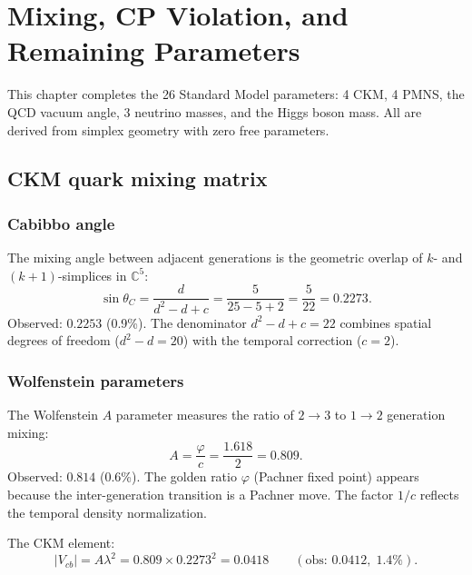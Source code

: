 \section{Mixing, CP Violation, and Remaining Parameters}
\label{ch:mixing}

This chapter completes the 26 Standard Model parameters: 4 CKM, 4 PMNS, the QCD vacuum angle, 3 neutrino masses, and the Higgs boson mass. All are derived from simplex geometry with zero free parameters.

\subsection{CKM quark mixing matrix}

\subsubsection{Cabibbo angle}

The mixing angle between adjacent generations is the geometric overlap of $k$- and $(k+1)$-simplices in $\mathbb{C}^5$:
\begin{equation}
\sin\theta_C = \frac{d}{d^2 - d + c} = \frac{5}{25 - 5 + 2} = \frac{5}{22} = 0.2273.
\end{equation}
Observed: $0.2253$ (0.9\%). The denominator $d^2 - d + c = 22$ combines spatial degrees of freedom ($d^2 - d = 20$) with the temporal correction ($c = 2$).

\subsubsection{Wolfenstein parameters}

The Wolfenstein $A$ parameter measures the ratio of $2 \to 3$ to $1 \to 2$ generation mixing:
\begin{equation}
A = \frac{\varphi}{c} = \frac{1.618}{2} = 0.809.
\end{equation}
Observed: $0.814$ (0.6\%). The golden ratio $\varphi$ (Pachner fixed point) appears because the inter-generation transition is a Pachner move. The factor $1/c$ reflects the temporal density normalization.

The CKM element:
\begin{equation}
|V_{cb}| = A\lambda^2 = 0.809 \times 0.2273^2 = 0.0418 \qquad (\text{obs: } 0.0412,\; 1.4\%).
\end{equation}


